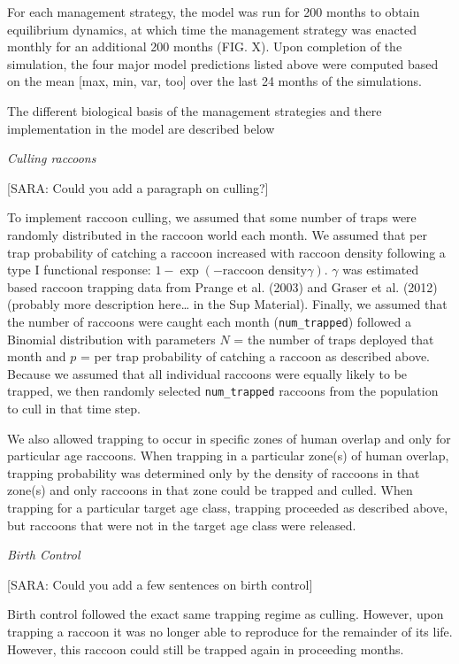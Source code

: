 \documentclass[11pt]{article}
\begin{document}
For each management strategy, the model was run for 200 months to
obtain equilibrium dynamics, at which time the management strategy was
enacted monthly for an additional 200 months (FIG. X). Upon completion
of the simulation, the four major model predictions listed above were
computed based on the mean [max, min, var, too] over the last 24
months of the simulations.

The different biological basis of the management strategies and there implementation in the model are described below

\bigskip
\noindent
\emph{Culling raccoons}

[SARA: Could you add a paragraph on culling?]

To implement raccoon culling, we assumed that some number of traps were
randomly distributed in the raccoon world each month. We assumed that
per trap probability of catching a raccoon increased with raccoon
density following a type I functional response: $1 - \exp(-\text{raccoon
density} \gamma)$. $\gamma$ was estimated
based raccoon trapping data from  Prange et al. (2003) and Graser et al.
(2012) (probably more description here\ldots{} in the Sup Material). Finally, we assumed
that the number of raccoons were caught each month (\texttt{num\_trapped}) followed a Binomial distribution with parameters $N$ = the number of traps deployed that month and $p$ = per trap probability of catching a raccoon as described above. Because we assumed that all
individual raccoons were equally likely to be trapped, we then randomly
selected \texttt{num\_trapped} raccoons from the
population to cull in that time step.

We also allowed trapping to occur in specific zones of human overlap and
only for particular age raccoons. When trapping in a particular zone(s)
of human overlap, trapping probability was determined only by the
density of raccoons in that zone(s) and only raccoons in that zone could
be trapped and culled. When trapping for a particular target age class,
trapping proceeded as described above, but raccoons that were not in the
target age class were released.

\bigskip
\noindent
\emph{Birth Control}

[SARA: Could you add a few sentences on birth control]

Birth control followed the exact same trapping regime as culling.
However, upon trapping a raccoon it was no longer able to reproduce for the remainder of its life. However, this raccoon could still be trapped again in proceeding months. 
\end{document}
